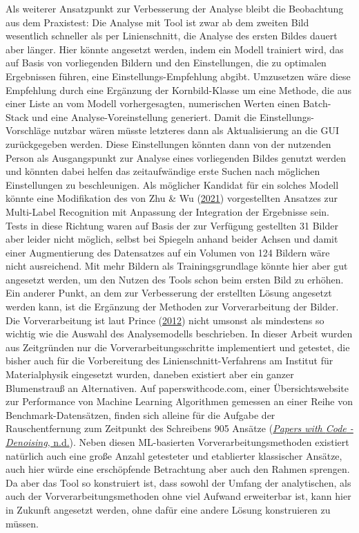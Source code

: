 \documentclass[
  12pt,
  openany]{book}
\begin{document}
Als weiterer Ansatzpunkt zur Verbesserung der Analyse bleibt die Beobachtung aus dem Praxistest: Die Analyse mit Tool ist zwar ab dem zweiten Bild wesentlich schneller als per Linienschnitt, die Analyse des ersten Bildes dauert aber länger. Hier könnte angesetzt werden, indem ein Modell trainiert wird, das auf Basis von vorliegenden Bildern und den Einstellungen, die zu optimalen Ergebnissen führen, eine Einstellungs-Empfehlung abgibt. Umzusetzen wäre diese Empfehlung durch eine Ergänzung der Kornbild-Klasse um eine Methode, die aus einer Liste an vom Modell vorhergesagten, numerischen Werten einen Batch-Stack und eine Analyse-Voreinstellung generiert. Damit die Einstellungs-Vorschläge nutzbar wären müsste letzteres dann als Aktualisierung an die GUI zurückgegeben werden. Diese Einstellungen könnten dann von der nutzenden Person als Ausgangspunkt zur Analyse eines vorliegenden Bildes genutzt werden und könnten dabei helfen das zeitaufwändige erste Suchen nach möglichen Einstellungen zu beschleunigen. Als möglicher Kandidat für ein solches Modell könnte eine Modifikation des von Zhu \& Wu (\protect\hyperlink{ref-zhuResidualAttentionSimple2021}{2021}) vorgestellten Ansatzes zur Multi-Label Recognition mit Anpassung der Integration der Ergebnisse sein. Tests in diese Richtung waren auf Basis der zur Verfügung gestellten 31 Bilder aber leider nicht möglich, selbst bei Spiegeln anhand beider Achsen und damit einer Augmentierung des Datensatzes auf ein Volumen von 124 Bildern wäre nicht ausreichend. Mit mehr Bildern als Trainingsgrundlage könnte hier aber gut angesetzt werden, um den Nutzen des Tools schon beim ersten Bild zu erhöhen.
Ein anderer Punkt, an dem zur Verbesserung der erstellten Lösung angesetzt werden kann, ist die Ergänzung der Methoden zur Vorverarbeitung der Bilder. Die Vorverarbeitung ist laut Prince (\protect\hyperlink{ref-princePartIVPreprocessing2012}{2012}) nicht umsonst als mindestens so wichtig wie die Auswahl des Analysemodells beschrieben. In dieser Arbeit wurden aus Zeitgründen nur die Vorverarbeitungsschritte implementiert und getestet, die bisher auch für die Vorbereitung des Linienschnitt-Verfahrens am Institut für Materialphysik eingesetzt wurden, daneben existiert aber ein ganzer Blumenstrauß an Alternativen. Auf paperswithcode.com, einer Übersichtswebsite zur Performance von Machine Learning Algorithmen gemessen an einer Reihe von Benchmark-Datensätzen, finden sich alleine für die Aufgabe der Rauschentfernung zum Zeitpunkt des Schreibens 905 Ansätze (\protect\hyperlink{ref-PapersCodeDenoising}{\emph{Papers with {Code} - {Denoising}}, n.d.}). Neben diesen ML-basierten Vorverarbeitungsmethoden existiert natürlich auch eine große Anzahl getesteter und etablierter klassischer Ansätze, auch hier würde eine erschöpfende Betrachtung aber auch den Rahmen sprengen.
Da aber das Tool so konstruiert ist, dass sowohl der Umfang der analytischen, als auch der Vorverarbeitungsmethoden ohne viel Aufwand erweiterbar ist, kann hier in Zukunft angesetzt werden, ohne dafür eine andere Lösung konstruieren zu müssen.
\end{document}
